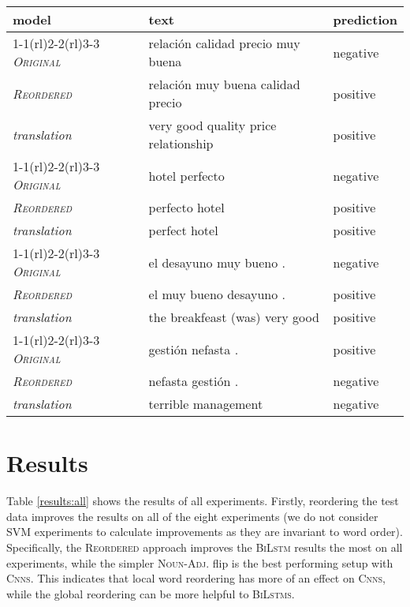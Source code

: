 \documentclass[a4paper,11pt,twocolumn,twoside]{article}
\newcommand{\original}{\textsc{Original}\xspace}
\newcommand{\mtreordered}{\textsc{Reordered}\xspace}
\newcommand{\nadj}{\textsc{Noun-Adj.}\xspace}
\newcommand{\bilstm}{\textsc{BiLstm}\xspace}
\newcommand{\bilstms}{\textsc{BiLstms}\xspace}
\newcommand{\cnns}{\textsc{Cnns}\xspace}
\begin{document}
\begin{table*}[]
\centering
\newcommand{\sepp}{\cmidrule(rl){1-1}\cmidrule(rl){2-2}\cmidrule(rl){3-3}}
\begin{tabular}{lll}
\toprule
model & text & prediction \\
\sepp
\emph{\original} & relación calidad precio muy buena & negative \\
\emph{\mtreordered} & relación muy buena calidad precio & positive \\
\textit{translation} & very good quality price relationship & positive \\
\sepp
\emph{\original} & hotel perfecto & negative \\
\emph{\mtreordered} & perfecto hotel & positive \\
\textit{translation} & perfect hotel & positive \\
\sepp
\emph{\original} & el desayuno muy bueno . & negative \\
\emph{\mtreordered} & el muy bueno desayuno . & positive \\
\textit{translation} & the breakfeast (was) very good & positive \\
\sepp
\emph{\original} & gestión nefasta . & positive \\
\emph{\mtreordered} & nefasta gestión . & negative \\
\textit{translation} & terrible management & negative \\
\bottomrule
\end{tabular}
\caption{Examples where reordering improves results over original on binary English-Spanish setup with the BiLSTM classifier.}
\label{helpful_examples}

\end{table*}


\section{Results}


Table \ref{results:all} shows the results of all experiments. Firstly, reordering the test data improves the results on all of the eight experiments (we do not consider SVM experiments to calculate improvements as they are invariant to word order). Specifically, the \mtreordered approach improves the \bilstm results the most on all experiments, while the simpler \nadj flip is the best performing setup with \cnns. This indicates that local word reordering has more of an effect on \cnns, while the global reordering can be more helpful to \bilstms.
\end{document}
